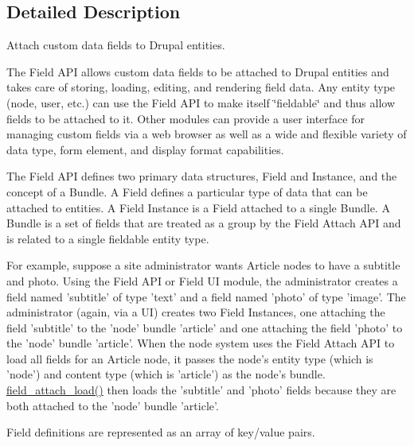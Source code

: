 \subsection{Detailed Description}
Attach custom data fields to Drupal entities.

The Field API allows custom data fields to be attached to Drupal entities and takes care of storing, loading, editing, and rendering field data. Any entity type (node, user, etc.) can use the Field API to make itself \char`\"{}fieldable\char`\"{} and thus allow fields to be attached to it. Other modules can provide a user interface for managing custom fields via a web browser as well as a wide and flexible variety of data type, form element, and display format capabilities.

The Field API defines two primary data structures, Field and Instance, and the concept of a Bundle. A Field defines a particular type of data that can be attached to entities. A Field Instance is a Field attached to a single Bundle. A Bundle is a set of fields that are treated as a group by the Field Attach API and is related to a single fieldable entity type.

For example, suppose a site administrator wants Article nodes to have a subtitle and photo. Using the Field API or Field UI module, the administrator creates a field named 'subtitle' of type 'text' and a field named 'photo' of type 'image'. The administrator (again, via a UI) creates two Field Instances, one attaching the field 'subtitle' to the 'node' bundle 'article' and one attaching the field 'photo' to the 'node' bundle 'article'. When the node system uses the Field Attach API to load all fields for an Article node, it passes the node's entity type (which is 'node') and content type (which is 'article') as the node's bundle. \hyperlink{group__field__attach_ga1e92543395961c912eb293b50e991586}{field\_\-attach\_\-load()} then loads the 'subtitle' and 'photo' fields because they are both attached to the 'node' bundle 'article'.

Field definitions are represented as an array of key/value pairs.

